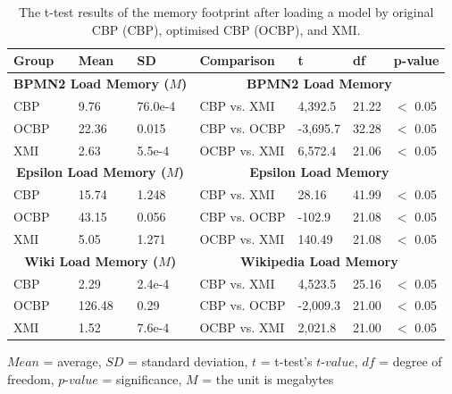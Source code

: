   
  \begin{table}[ht]
    \footnotesize
    \centering
    \caption{The t-test results of the memory footprint after loading a model by original CBP (CBP), optimised CBP (OCBP), and XMI.}
    \label{table:ttest_results_load_memory}
    \begin{tabular}
      {|p{}p{}p{}|p{}p{}p{}p{}|}
      \hline
      
      Group & Mean & SD & Comparison & t & df & p-value \\
      \hline
      \multicolumn{3}{|c|}{\textbf{BPMN2 Load Memory ($M$)}} & \multicolumn{4}{c|}{\textbf{BPMN2 Load Memory}} \\
      CBP & 9.76 & 76.0e-4 & CBP vs. XMI & 4,392.5 & 21.22 & $<$ 0.05 \\
      OCBP & 22.36 & 0.015 & CBP vs. OCBP & -3,695.7 & 32.28 & $<$ 0.05 \\
      XMI & 2.63 & 5.5e-4 & OCBP vs. XMI & 6,572.4 & 21.06 & $<$ 0.05 \\
      \hline
      
      \multicolumn{3}{|c|}{\textbf{Epsilon Load Memory ($M$)}} & \multicolumn{4}{c|}{\textbf{Epsilon Load Memory}} \\
      CBP &15.74 & 1.248 & CBP vs. XMI & 28.16 & 41.99 & $<$ 0.05 \\
      OCBP & 43.15 & 0.056 & CBP vs. OCBP & -102.9 &21.08 & $<$ 0.05 \\
      XMI & 5.05 & 1.271 & OCBP vs. XMI & 140.49 & 21.08 & $<$ 0.05 \\
      \hline
      
      \multicolumn{3}{|c|}{\textbf{Wiki Load Memory ($M$)}} & \multicolumn{4}{c|}{\textbf{Wikipedia Load Memory}} \\
      CBP & 2.29 & 2.4e-4 & CBP vs. XMI & 4,523.5 & 25.16 & $<$ 0.05 \\
      OCBP & 126.48 & 0.29 & CBP vs. OCBP & -2,009.3 & 21.00 & $<$ 0.05 \\
      XMI & 1.52 & 7.6e-4 & OCBP vs. XMI & 2,021.8 & 21.00 & $<$ 0.05 \\
      \hline
    \end{tabular}
    \justify
    $Mean$ = average, $SD$ = standard deviation, $t$ = t-test’s $t$-$value$, $df$ = degree of freedom, $p$-$value$ = significance, $M$ = the unit is megabytes
  \end{table}


